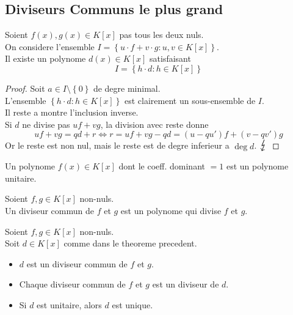 \documentclass[../main.tex]{subfiles}
\begin{document}
\subsection{Diviseurs Communs le plus grand}
\begin{thm}
Soient $f( x) ,g( x) \in K[x]$ pas tous les deux nuls.\\
On considere l'ensemble $I= \left\{ u \cdot f + v \cdot g: u,v \in K[x] \right\} $.\\
Il existe un polynome $d( x) \in K[x]$ satisfaisant
\[ 
	I = \left\{ h \cdot d : h \in K[x] \right\} 
\]


\end{thm}
\begin{proof}
Soit $a \in I \setminus \left\{ 0 \right\} $ de degre minimal.\\
L'ensemble $ \left\{ h \cdot d: h \in K[x] \right\} $ est clairement un sous-ensemble de $I$.\\
Il reste a montre l'inclusion inverse.\\
Si $d$ ne divise pas $uf + vg$, la division avec reste donne
\[ 
	uf + vg = qd + r \iff r = uf +vg -qd = ( u -q u') f + ( v-qv') g
\]
Or le reste est non nul, mais le reste est de degre inferieur a $
\deg d$. $\contra$
\end{proof}
\begin{defn}
	Un polynome $f( x) \in K[x]$ dont le coeff. dominant $=1$ est un polynome unitaire.
\end{defn}
\begin{defn}\label{defn:Diviseur Commundiviseur_commun}
	Soient $f,g \in K[x]$ non-nuls.\\
	Un diviseur commun de $f$ et $g$ est un polynome qui divise $f$ et $g$.
\end{defn}
\begin{thm}
	Soient $f,g \in K[x]$ non-nuls.\\
	Soit $d \in K[x]$ comme dans le theoreme precedent.\\
	\begin{itemize}
	\item $d$ est un diviseur commun de $f$ et $g$.
	\item Chaque diviseur commun de $f$ et $g$ est un diviseur de $d$.
	\item Si $d$ est unitaire, alors $d$ est unique.
	\end{itemize}
	
\end{thm}
\end{document}

